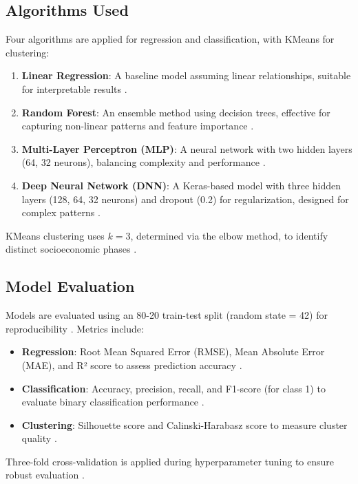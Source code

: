 \documentclass[12pt]{article}
\begin{document}
	\subsection{Algorithms Used}
	Four algorithms are applied for regression and classification, with KMeans for clustering:
	\begin{enumerate}
		\item \textbf{Linear Regression}: A baseline model assuming linear relationships, suitable for interpretable results \citep{hastie, scikit-learn}.
		\item \textbf{Random Forest}: An ensemble method using decision trees, effective for capturing non-linear patterns and feature importance \citep{breiman, scikit-learn}.
		\item \textbf{Multi-Layer Perceptron (MLP)}: A neural network with two hidden layers (64, 32 neurons), balancing complexity and performance \citep{scikit-learn, goodfellow}.
		\item \textbf{Deep Neural Network (DNN)}: A Keras-based model with three hidden layers (128, 64, 32 neurons) and dropout (0.2) for regularization, designed for complex patterns \citep{tensorflow, goodfellow}.
	\end{enumerate}
	KMeans clustering uses $k=3$, determined via the elbow method, to identify distinct socioeconomic phases \citep{scikit-learn, hastie}.
	
	\subsection{Model Evaluation}
	Models are evaluated using an 80-20 train-test split (random state = 42) for reproducibility \citep{scikit-learn}. Metrics include:
	\begin{itemize}
		\item \textbf{Regression}: Root Mean Squared Error (RMSE), Mean Absolute Error (MAE), and R² score to assess prediction accuracy \citep{hastie}.
		\item \textbf{Classification}: Accuracy, precision, recall, and F1-score (for class 1) to evaluate binary classification performance \citep{geron}.
		\item \textbf{Clustering}: Silhouette score and Calinski-Harabasz score to measure cluster quality \citep{clustering_metrics}.
	\end{itemize}
	Three-fold cross-validation is applied during hyperparameter tuning to ensure robust evaluation \citep{scikit-learn}.
	
\end{document}
